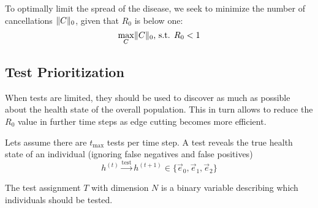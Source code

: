 To optimally limit the spread of the disease, we seek to minimize the number of cancellations $\lVert C\rVert_0$, given that $R_0$ is below one:
\begin{equation}
	\max_{C} \lVert C\rVert_0\text{, s.t. }R_0 < 1
\end{equation}


\subsection{Test Prioritization}
When tests are limited, they should be used to discover as much as possible about the health state of the overall population.
This in turn allows to reduce the $R_0$ value in further time steps as edge cutting becomes more efficient.

Lets assume there are $t_{\text{max}}$ tests per time step.
A test reveals the true health state of an individual (ignoring false negatives and false positives)
\begin{equation}
	h^{(t)} \xrightarrow{\text{test}} h^{(t+1)} \in \{\vec{e}_0, \vec{e}_1, \vec{e}_2 \}
\end{equation}

The test assignment $T$ with dimension $N$ is a binary variable describing which individuals should be tested.